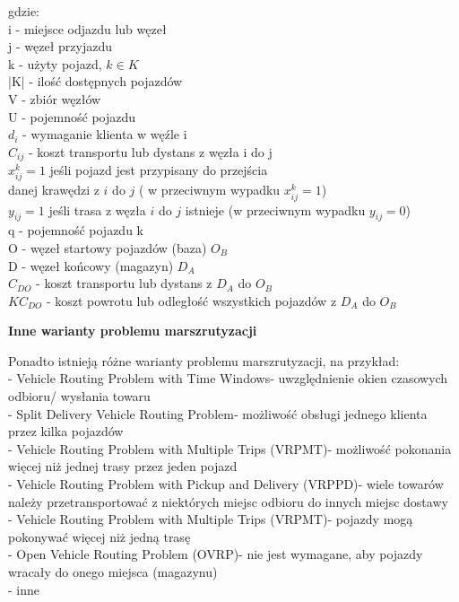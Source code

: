 \documentclass[a4paper, twoside, 12pt, justified]{article}
\begin{document}
	gdzie:\\
	i - miejsce odjazdu lub węzeł\\
	j - węzeł przyjazdu\\
	k - użyty pojazd, $k \in K$\\
	|K| - ilość dostępnych pojazdów\\
	V - zbiór węzłów\\
	U - pojemność pojazdu\\
	$d_{i}$ - wymaganie klienta w węźle i\\
	$C_{ij}$ - koszt transportu lub dystans z węzła i do j\\
	$x_{ij}^{k} = 1$ jeśli pojazd jest przypisany do przejścia\\ danej krawędzi z $i$ do $j$ ( w przeciwnym wypadku $x_{ij}^{k} = 1$)\\
	$y_{ij} = 1$ jeśli trasa z węzła $i$ do $j$ istnieje (w przeciwnym wypadku $y_{ij} = 0$)\\
	q - pojemność pojazdu k\\
	O - węzeł startowy pojazdów (baza) $O_B$\\
	D - węzeł końcowy (magazyn) $D_A$\\
	$C_{DO}$ - koszt transportu lub dystans z $D_A$ do $O_B$\\
	$KC_{DO}$ - koszt powrotu lub odległość wszystkich pojazdów z $D_A$ do $O_B$\\
	
	\begin{large}
		\begin{center}
			\textbf{Inne warianty problemu marszrutyzacji}
		\end{center}
	\end{large} 
	
	
	Ponadto istnieją różne warianty problemu marszrutyzacji, na przykład:\\ 
	- Vehicle Routing Problem with Time Windows- uwzględnienie okien czasowych odbioru/ wysłania towaru\\
	- Split Delivery Vehicle Routing Problem- możliwość obsługi jednego klienta przez kilka pojazdów\\
	- Vehicle Routing Problem with Multiple Trips (VRPMT)- możliwość pokonania więcej niż jednej trasy przez jeden pojazd\\
	- Vehicle Routing Problem with Pickup and Delivery (VRPPD)- wiele towarów należy przetransportować z niektórych miejsc odbioru do innych miejsc dostawy\\
	- Vehicle Routing Problem with Multiple Trips (VRPMT)- pojazdy mogą pokonywać więcej niż jedną trasę\\
	- Open Vehicle Routing Problem (OVRP)- nie jest wymagane, aby pojazdy wracały do onego miejsca (magazynu)\\
	- inne
	
\end{document}
